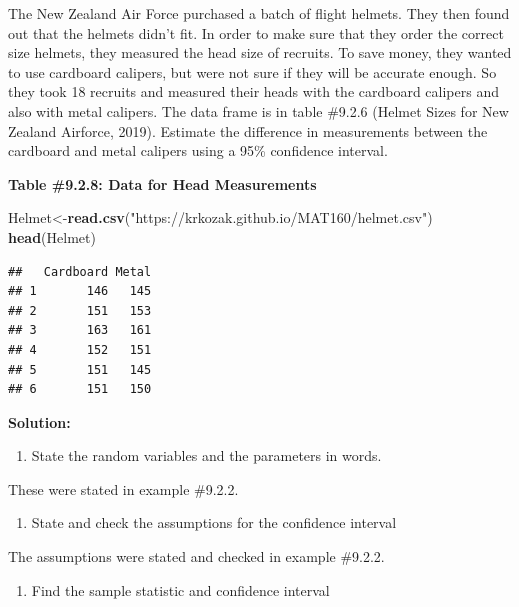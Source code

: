 \documentclass[
]{book}
\newenvironment{Shaded}{\begin{snugshade}}{\end{snugshade}}
\newcommand{\KeywordTok}[1]{\textcolor[rgb]{0.13,0.29,0.53}{\textbf{#1}}}
\newcommand{\NormalTok}[1]{#1}
\newcommand{\StringTok}[1]{\textcolor[rgb]{0.31,0.60,0.02}{#1}}
\providecommand{\tightlist}{%
  \setlength{\itemsep}{0pt}\setlength{\parskip}{0pt}}
\begin{document}
The New Zealand Air Force purchased a batch of flight helmets. They then found out that the helmets didn't fit. In order to make sure that they order the correct size helmets, they measured the head size of recruits. To save money, they wanted to use cardboard calipers, but were not sure if they will be accurate enough. So they took 18 recruits and measured their heads with the cardboard calipers and also with metal calipers. The data frame is in table \#9.2.6 (Helmet Sizes for New Zealand Airforce, 2019). Estimate the difference in measurements between the cardboard and metal calipers using a 95\% confidence interval.

\textbf{Table \#9.2.8: Data for Head Measurements}

\begin{Shaded}
\begin{Highlighting}[]
\NormalTok{Helmet<-}\KeywordTok{read.csv}\NormalTok{(}\StringTok{"https://krkozak.github.io/MAT160/helmet.csv"}\NormalTok{)}
\KeywordTok{head}\NormalTok{(Helmet)}
\end{Highlighting}
\end{Shaded}

\begin{verbatim}
##   Cardboard Metal
## 1       146   145
## 2       151   153
## 3       163   161
## 4       152   151
## 5       151   145
## 6       151   150
\end{verbatim}

\textbf{Solution:}

\begin{enumerate}
\def\labelenumi{\arabic{enumi}.}
\tightlist
\item
  State the random variables and the parameters in words.
\end{enumerate}

These were stated in example \#9.2.2.

\begin{enumerate}
\def\labelenumi{\arabic{enumi}.}
\setcounter{enumi}{1}
\tightlist
\item
  State and check the assumptions for the confidence interval
\end{enumerate}

The assumptions were stated and checked in example \#9.2.2.

\begin{enumerate}
\def\labelenumi{\arabic{enumi}.}
\setcounter{enumi}{2}
\tightlist
\item
  Find the sample statistic and confidence interval
\end{enumerate}
\end{document}
